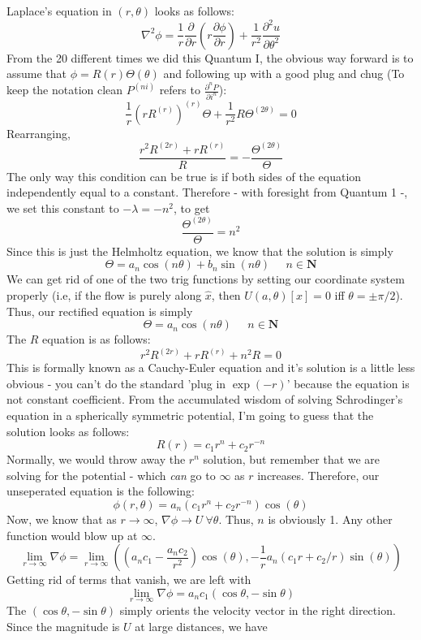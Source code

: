 \documentclass[english]{article}
\begin{document}
Laplace's equation in $(r,\theta)$ looks as follows:
$$ \nabla^{2} \phi = \frac{1}{r}\frac{\partial}{\partial r}\left(
	r\frac{\partial \phi}{\partial r}\right) + 
	\frac{1}{r^{2}}\frac{\partial^{2} u}{\partial\theta^{2}}
$$
From the 20 different times we did this Quantum I, the obvious way forward is
to assume that $\phi=R(r)\Theta(\theta)$ and following up with a good plug and 
chug (To keep the notation clean $P^{(ni)}$ refers to 
$\frac{\partial^{n} P}{\partial i^{n}}$):
$$ \frac{1}{r}(rR^{(r)})^{(r)}\Theta + \frac{1}{r^{2}}R\Theta^{(2\theta)}=0$$
Rearranging,
$$ \frac{r^{2}R^{(2r)}+rR^{(r)}}{R} = -\frac{\Theta^{(2\theta)}}{\Theta}$$
The only way this condition can be true is if both sides of the equation
independently equal to a constant.
Therefore - with foresight from Quantum 1 -, we set this constant to 
$-\lambda=-n^{2}$, to get
$$ \frac{\Theta^{(2\theta)}}{\Theta} = n^{2}$$
Since this is just the Helmholtz equation, we know that the solution is simply
$$ \Theta = a_n\cos(n\theta)+b_n\sin(n\theta) \;\;\;\;\; n\in\mathbf{N}$$
We can get rid of one of the two trig functions by setting our coordinate
system properly (i.e, if the flow is purely along $\hat{x}$, then 
$U(a,\theta)[x]=0$ iff $\theta=\pm\pi/2$). 
Thus, our rectified equation is simply
$$ \Theta = a_n\cos(n\theta)\;\;\;\;\; n\in\mathbf{N}$$
The $R$ equation is as follows:
$$ r^{2} R^{(2r)}+rR^{(r)}+n^{2}R=0 $$
This is formally known as a Cauchy-Euler equation and it's solution is a little 
less obvious - you can't do the standard 'plug in $\exp(-r)$' because the equation
is not constant coefficient. 
From the accumulated wisdom of solving Schrodinger's equation in 
a spherically symmetric potential, I'm going to guess that the solution looks
as follows:
$$ R(r) = c_{1}r^{n}+c_{2}r^{-n} $$
Normally, we would throw away the $r^{n}$ solution, but remember that we are
solving for the potential - which \textit{can} go to $\infty$ as $r$ increases.
Therefore, our unseperated equation is the following:
$$\phi(r,\theta)=a_n(c_{1}r^{n}+c_{2}r^{-n})\cos(\theta)$$
Now, we know that as $r\rightarrow \infty$, $\nabla\phi\rightarrow U \ \forall \theta$. 
Thus, $n$ is obviously 1.
Any other function would blow up at $\infty$.
$$ \lim_{r\rightarrow\infty}\nabla\phi = 
	\lim_{r\rightarrow\infty}((a_nc_{1}-\frac{a_nc_{2}}{r^{2}})\cos(\theta),
	-\frac{1}{r}a_n(c_1r+c_2/r)\sin(\theta))
$$
Getting rid of terms that vanish, we are left with
$$ \lim_{r\rightarrow\infty}\nabla\phi = 
	a_nc_{1}(\cos\theta,-\sin\theta)
$$
The $(\cos\theta,-\sin\theta)$ simply orients the velocity vector in the right
direction.
Since the magnitude is $U$ at large distances, we have
\end{document}
